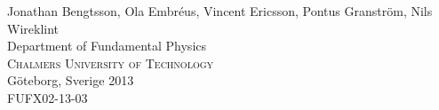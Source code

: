 \documentclass[../main/report.tex]{subfiles}
\begin{document}
\begin{titlepage}
\begin{flushleft}
{    

	{\Large Jonathan Bengtsson, Ola Embréus, Vincent Ericsson, Pontus Granström, Nils Wireklint}\\[1 cm]

	

	{\Large Department of Fundamental Physics \\

	\textsc{Chalmers University of Technology} \\

	Göteborg, Sverige 2013 \\

    FUFX02-13-03\\

	} 

	}

\end{flushleft}



\end{titlepage}



\ClearShipoutPicture



\newpage 
\end{document}

